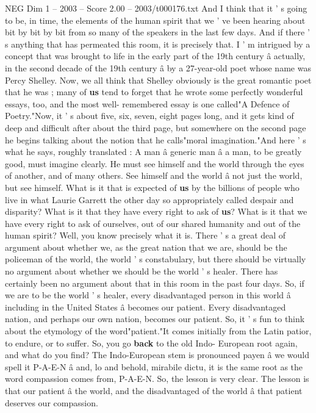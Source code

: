 \begin{textsample}{NEG Dim 1 – 2003 – Score 2.00 – 2003/t000176.txt}
And I think that it ' s going to be, in time, the elements of the human spirit that we ' ve been hearing about bit by bit by bit from so many of the speakers in the last few days.
And if there ' s anything that has permeated this room, it is precisely that.
I ' m intrigued by a concept that was brought to life in the early part of the 19th century â actually, in the second decade of the 19th century â by a 27-year-old poet whose name was Percy Shelley.
Now, we all think that Shelley obviously is the great romantic poet that he was ; many of \textbf{us} tend to forget that he wrote some perfectly wonderful essays, too, and the most well- remembered essay is one called"A Defence of Poetry."Now, it ' s about five, six, seven, eight pages long, and it gets kind of deep and difficult after about the third page, but somewhere on the second page he begins talking about the notion that he calls"moral imagination."And here ' s what he says, roughly translated : A man â generic man â a man, to be greatly good, must imagine clearly.
He must see himself and the world through the eyes of another, and of many others.
See himself and the world â not just the world, but see himself.
What is it that is expected of \textbf{us} by the billions of people who live in what Laurie Garrett the other day so appropriately called despair and disparity?
What is it that they have every right to ask of \textbf{us}?
What is it that we have every right to ask of ourselves, out of our shared humanity and out of the human spirit?
Well, you know precisely what it is.
There ' s a great deal of argument about whether we, as the great nation that we are, should be the policeman of the world, the world ' s constabulary, but there should be virtually no argument about whether we should be the world ' s healer.
There has certainly been no argument about that in this room in the past four days.
So, if we are to be the world ' s healer, every disadvantaged person in this world â including in the United States â becomes our patient.
Every disadvantaged nation, and perhaps our own nation, becomes our patient.
So, it ' s fun to think about the etymology of the word"patient."It comes initially from the Latin patior, to endure, or to suffer.
So, you go \textbf{back} to the old Indo- European root again, and what do you find?
The Indo-European stem is pronounced payen â we would spell it P-A-E-N â and, lo and behold, mirabile dictu, it is the same root as the word compassion comes from, P-A-E-N.
So, the lesson is very clear.
The lesson is that our patient â the world, and the disadvantaged of the world â that patient deserves our compassion.

\end{textsample}
